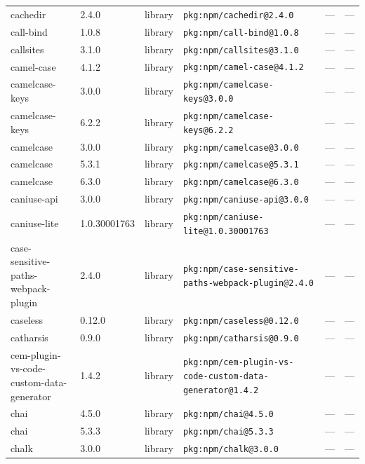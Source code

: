 \documentclass[11pt,a4paper]{article}
\begin{document}
\begin{longtable}{|p{4cm}|p{2cm}|p{1.6cm}|p{5cm}|p{1.5cm}|p{3.5cm}|}
\raggedright cachedir & 2.4.0 & library & \small\texttt{pkg:npm/cachedir@2.4.0} & — & \small — \\
\raggedright call-bind & 1.0.8 & library & \small\texttt{pkg:npm/call-bind@1.0.8} & — & \small — \\
\raggedright callsites & 3.1.0 & library & \small\texttt{pkg:npm/callsites@3.1.0} & — & \small — \\
\raggedright camel-case & 4.1.2 & library & \small\texttt{pkg:npm/camel-case@4.1.2} & — & \small — \\
\raggedright camelcase-keys & 3.0.0 & library & \small\texttt{pkg:npm/camelcase-keys@3.0.0} & — & \small — \\
\raggedright camelcase-keys & 6.2.2 & library & \small\texttt{pkg:npm/camelcase-keys@6.2.2} & — & \small — \\
\raggedright camelcase & 3.0.0 & library & \small\texttt{pkg:npm/camelcase@3.0.0} & — & \small — \\
\raggedright camelcase & 5.3.1 & library & \small\texttt{pkg:npm/camelcase@5.3.1} & — & \small — \\
\raggedright camelcase & 6.3.0 & library & \small\texttt{pkg:npm/camelcase@6.3.0} & — & \small — \\
\raggedright caniuse-api & 3.0.0 & library & \small\texttt{pkg:npm/caniuse-api@3.0.0} & — & \small — \\
\raggedright caniuse-lite & 1.0.30001763 & library & \small\texttt{pkg:npm/caniuse-lite@1.0.30001763} & — & \small — \\
\raggedright case-sensitive-paths-webpack-plugin & 2.4.0 & library & \small\texttt{pkg:npm/case-sensitive-paths-webpack-plugin@2.4.0} & — & \small — \\
\raggedright caseless & 0.12.0 & library & \small\texttt{pkg:npm/caseless@0.12.0} & — & \small — \\
\raggedright catharsis & 0.9.0 & library & \small\texttt{pkg:npm/catharsis@0.9.0} & — & \small — \\
\raggedright cem-plugin-vs-code-custom-data-generator & 1.4.2 & library & \small\texttt{pkg:npm/cem-plugin-vs-code-custom-data-generator@1.4.2} & — & \small — \\
\raggedright chai & 4.5.0 & library & \small\texttt{pkg:npm/chai@4.5.0} & — & \small — \\
\raggedright chai & 5.3.3 & library & \small\texttt{pkg:npm/chai@5.3.3} & — & \small — \\
\raggedright chalk & 3.0.0 & library & \small\texttt{pkg:npm/chalk@3.0.0} & — & \small — \\

\end{longtable}
\end{document}
